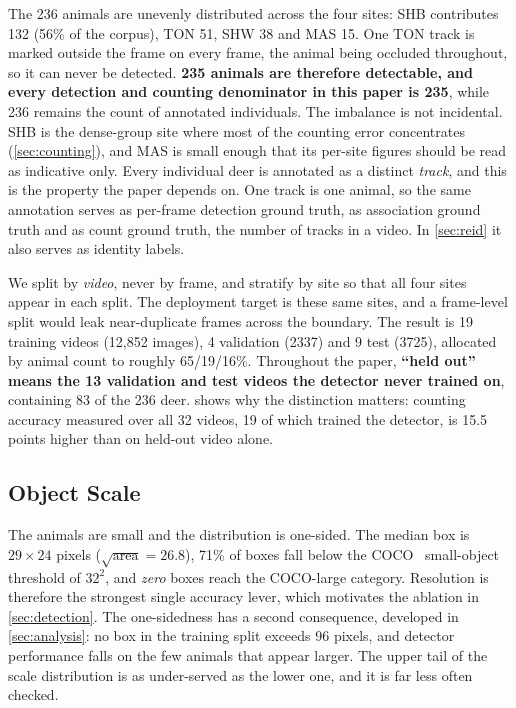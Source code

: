 The 236 animals are unevenly distributed across the four sites: SHB contributes 132 (56\% of
the corpus), TON 51, SHW 38 and MAS 15. One TON track is marked outside the frame on every
frame, the animal being occluded throughout, so it can never be detected. \textbf{235 animals
are therefore detectable, and every detection and counting denominator in this paper is
235}, while 236 remains the count of annotated individuals. The imbalance is not incidental.
SHB is the dense-group site where most of the counting error concentrates
(\cref{sec:counting}), and MAS is small enough that its per-site figures should be read as
indicative only. Every individual deer is annotated as a distinct \emph{track}, and this is
the property the paper depends on. One track is one animal, so the same annotation serves as
per-frame detection ground truth, as association ground truth and as count ground truth,
the number of tracks in a video. In \cref{sec:reid} it also serves as identity labels.

We split by \emph{video}, never by frame, and stratify by site so that all four sites appear
in each split. The deployment target is these same sites, and a frame-level split would leak
near-duplicate frames across the boundary. The result is 19 training videos (12,852
images), 4 validation (2337) and 9 test (3725), allocated by animal count to roughly
65/19/16\%. Throughout the paper, \textbf{``held out'' means the 13 validation and test
videos the detector never trained on}, containing 83 of the 236 deer. 
shows why the distinction matters: counting accuracy measured over all 32 videos, 19 of
which trained the detector, is 15.5 points higher than on held-out video alone.

\subsection{Object Scale}
\label{sec:scale}

The animals are small and the distribution is one-sided. The median box is $29\times24$
pixels ($\sqrt{\text{area}}=26.8$), 71\% of boxes fall below the COCO~\cite{lin2014coco}
small-object threshold of $32^2$, and \emph{zero} boxes reach the COCO-large category.
Resolution is therefore the strongest single accuracy lever, which motivates the ablation in
\cref{sec:detection}. The one-sidedness has a second consequence, developed in
\cref{sec:analysis}: no box in the training split exceeds 96 pixels, and detector
performance falls on the few animals that appear larger. The upper tail of the scale
distribution is as under-served as the lower one, and it is far less often checked.

